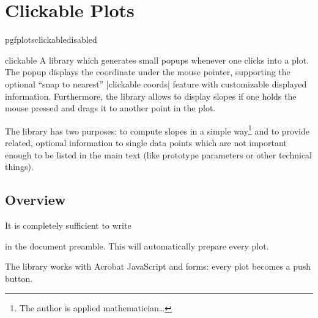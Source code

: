 
\section[libs.clickable]{Clickable Plots}

\begingroup
\def\pgfplotsmanualcurlibrary{clickable}
    \expandafter\ifx\csname pgfplotsclickabledisabled\endcsname\relax
    \else
    \fi

\begin{pgfplotslibrary}{clickable}
    A library which generates small popups whenever one clicks into a plot. The
    popup displays the coordinate under the mouse pointer, supporting the
    optional ``snap to nearest'' |clickable coords| feature with customizable
    displayed information. Furthermore, the library allows to display slopes if
    one holds the mouse pressed and drags it to another point in the plot.

    The library has two purposes: to compute slopes in a simple
    way\footnote{The author is applied mathematician\ldots} and to provide
    related, optional information to single data points which are not important
    enough to be listed in the main text (like prototype parameters or other
    technical things).
\end{pgfplotslibrary}


\subsection{Overview}

It is completely sufficient to write
%
\begin{codeexample}
\end{codeexample}
%
\noindent in the document preamble. This will automatically prepare every plot.

The library works with Acrobat JavaScript and \pdf{} forms: every plot becomes
a push button.

